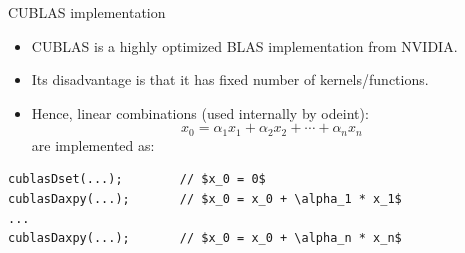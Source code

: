 \documentclass[@BEAMER_OPTIONS@]{beamer}
\begin{document}

\begin{frame}[fragile]{CUBLAS implementation}
    \begin{itemize}
        \item CUBLAS is a highly optimized BLAS implementation from NVIDIA.
        \item Its disadvantage is that it has fixed number of
            kernels/functions.
        \item Hence, linear combinations (used internally by odeint):
            \begin{equation*}
                x_0 = \alpha_1 x_1 + \alpha_2 x_2 + \cdots + \alpha_n x_n
            \end{equation*}
            are implemented as:
    \end{itemize}
    \begin{exampleblock}{}
        \begin{lstlisting}[numbers=none,texcl=true]
cublasDset(...);        // $x_0 = 0$
cublasDaxpy(...);       // $x_0 = x_0 + \alpha_1 * x_1$
...
cublasDaxpy(...);       // $x_0 = x_0 + \alpha_n * x_n$
        \end{lstlisting}
    \end{exampleblock}
\end{frame}

\note{ }
\end{document}
